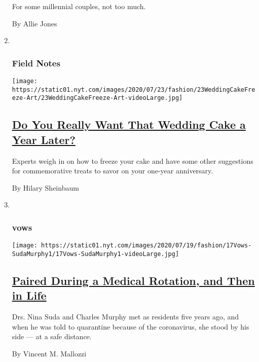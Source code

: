 \begin{enumerate}
  For some millennial couples, not too much.

  By Allie Jones
\item ~
  \hypertarget{field-notes-1}{%
  \subsubsection{Field Notes}\label{field-notes-1}}

  \texttt{[image: https://static01.nyt.com/images/2020/07/23/fashion/23WeddingCakeFreeze-Art/23WeddingCakeFreeze-Art-videoLarge.jpg]}

  \hypertarget{do-you-really-want-that-wedding-cake-a-year-later}{%
  \subsection{\texorpdfstring{\href{/2020/07/22/fashion/weddings/do-you-really-want-that-wedding-cake-a-year-later.html}{Do
  You Really Want That Wedding Cake a Year
  Later?}}{Do You Really Want That Wedding Cake a Year Later?}}\label{do-you-really-want-that-wedding-cake-a-year-later}}

  Experts weigh in on how to freeze your cake and have some other
  suggestions for commemorative treats to savor on your one-year
  anniversary.

  By Hilary Sheinbaum
\item ~
  \hypertarget{vows-2}{%
  \subsubsection{vows}\label{vows-2}}

  \texttt{[image: https://static01.nyt.com/images/2020/07/19/fashion/17Vows-SudaMurphy1/17Vows-SudaMurphy1-videoLarge.jpg]}

  \hypertarget{paired-during-a-medical-rotation-and-then-in-life}{%
  \subsection{\texorpdfstring{\href{/2020/07/17/fashion/weddings/paired-during-a-medical-rotation-and-then-in-life.html}{Paired
  During a Medical Rotation, and Then in
  Life}}{Paired During a Medical Rotation, and Then in Life}}\label{paired-during-a-medical-rotation-and-then-in-life}}

  Drs. Nina Suda and Charles Murphy met as residents five years ago, and
  when he was told to quarantine because of the coronavirus, she stood
  by his side --- at a safe distance.

  By Vincent M. Mallozzi
\end{enumerate}

